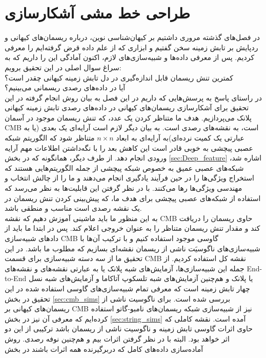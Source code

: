 \section{طراحی  خط مشی آشکارسازی}
\label{sec:detection}
\par
در فصل‌های گذشته مروری داشتیم بر کیهان‌شناسی نوین، درباره ریسمان‌های کیهانی و ردپایش بر تابش زمینه سخن گفتیم و ابزاری که از علم داده قرض گرفته‌ایم را معرفی کردیم. پس از معرفی داده‌ها و شبیه‌سازی‌های لازم، اکنون آمادگی این را داریم که به سراغ سوال اصلی در این تحقیق برویم: \\
کمترین تنش ریسمان قابل اندازه‌گیری در دل تابش زمینه کیهانی چقدر است؟ \\
آیا در داده‌های رصدی ریسمانی می‌بینیم؟  \\
در راستای پاسخ به پرسش‌هایی که داریم در این فصل به بیان روش انجام گرفته در این تحقیق برای آشکارسازی ریسمان‌های کیهانی در داده‌های رصدی تابش زمینه کیهانی پلانک می‌پردازیم. هدف ما متناظر کردن یک عدد، که تنش ریسمان موجود در آسمان  CMB است، به نقشه‌های رصدی است. به بیان دیگر لازم است آرایه‌ای یک بعدی (یا به عبارتی یک کمیت نرده‌ای)به آرایه‌ای به ابعاد $n\times n$ متناظر شود که الگوریتم شبکه عصبی پیچشی به خوبی قادر است این کاهش بعد را با نگه‌داشتن اطلاعات مهم آرایه ورودی انجام دهد. از طرف دیگر، همانگونه که در بخش 
\ref{sec:Deep_feature}
اشاره شد، شبکه‌های عصبی عمیق به خصوص شبکه پیچشی از جمله الگوریتم‌هایی هستند که استخراج ویژگی‌ها را در حین فرآیند یادگیری انجام می‌دهند و ما را از چالش انتخاب و مهندسی ویژگی‌ها رها می‌کنند. با در نظر گرفتن این قابلیت‌ها به نظر می‌رسد که استفاده از شبکه‌های عصبی پیچشی برای هدف ما، که پیش‌بینی کردن تنش ریسمان در یک نقشه رصدی است مناسب و منطقی باشد.
\\
به این منظور ما باید ماشینی آموزش دهیم که نقشه CMB حاوی ریسمان را دریافت کند و مقدار تنش ریسمان متناظر را به عنوان خروجی اعلام کند. پس در ابتدا ما باید از داد‌های شبیه‌سازی CMB گاوسی موجود استفاده کنیم و با ترکیب آن‌ها با شبیه‌سازی‌های ناگوسیَت ناشی از ریسمان نقشه‌ای بسازیم که مطلوب ما باشد. در این تحقیق ما از سه دسته شبیه‌سازی برای قسمت CMB نقشه کل استفاده کردیم. از جمله این شبیه‌سازی‌ها، آزمایش‌های شبه پلانک یا به عبارتی نقشه‌های
و نقشه‌های End-to-End یا 
 پلانک و هم‌چنین آزمایش‌های شبه تلسکوپ آتاکاما و آزمایش‌های شبه نسل چهار تابش زمینه است که معرفی تمام شبیه‌سازی‌های گاوسی استفاده شده در این تحقیق در بخش 
\ref{sec:cmb_sims}
بررسی شده است. برای ناگوسیت ناشی از ریسمان‌های کیهانی بر CMB نیز از شبیه‌سازی شبکه ریسمان‌های نامبو-گاتو 
\cite{bennett1990high}
\cite{ringeval2007cosmological}
استفاده کرده‌ایم که معرفی آن نیز در بخش  
\ref{sec:string_sims}
آمده است. نقشه کاملی که حاوی اثرات گاوسی تابش زمینه و ناگوسیت ناشی از ریسمان باشد ترکیبی از این دو اثر خواهد بود. البته با در نظر گرفتن اثرات بیم و هم‌چنین نوفه رصدی. روش آماده‌سازی داده‌های کامل که دربرگیرنده همه اثرات باشند در بخش 
